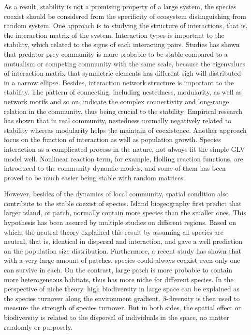     As a result, stability is not a promising property of a large system, the species coexist should be considered from the specificity of ecosystem distinguishing from random system. One approach is to studying the structure of interactions, that is, the interaction  matrix of the system. Interaction types is important to the stability, which related to the signs of each interacting pairs. Studies has shown that predator-prey community is more probable to be stable compared to a mutualism or competing community with the same scale, because the eigenvalues of interaction matrix that symmetric elements has different sigh will distributed in a narrow ellipse. Besides, interaction network structure is important to the stability. The pattern of connecting, including nestedness, modularity, as well as network motifs and so on, indicate the complex connectivity and long-range relation in the community, thus being crucial to the stability. Empirical research has shown that in real community, nestedness normally negatively related to stability whereas modularity helps the maintain of coexistence. Another approach focus on the function of interaction as well as population growth. Species interaction as a complicated process in the nature, not always fit the simple GLV model well. Nonlinear reaction term, for example, Holling reaction functions, are introduced to the community dynamic models, and some of them has been proved to be much easier being stable with random matrices.

    However, besides of the dynamics of local community, spatial condition also contribute to the stable coexist of species. Island biogeography first predict that larger island, or patch, normally contain more species than the smaller ones. This hypothesis has been assured by multiple studies on different regions. Based on which, the neutral theory explained this result by assuming all species are neutral, that is, identical in dispersal and interaction, and gave a well prediction on the population size distribution. Furthermore, a recent study has shown that with a very large amount of patches, species could always coexist even only one can survive in each. On the contrast, large patch is more probable to contain more heterogeneous habitats, thus has more niche for different species. In the perspective of niche theory, high biodiversity in large space can be explained as the species turnover along the environment gradient. $\beta$-diversity is then used to measure the strength of species turnover. But in both sides, the spatial effect on biodiversity is related to the dispersal of individuals in the space, no matter randomly or purposely.

